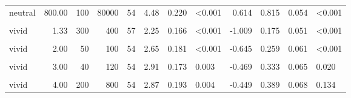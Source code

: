 \documentclass[
]{article}
\begin{document}
\begin{longtable}[t]{lrrrrrrlrrrl}
\hspace{1em}neutral & 800.00 & 100 & 80000 & 54 & 4.48 & 0.220 & <0.001 & 0.614 & 0.815 & 0.054 & <0.001\\
\hspace{1em}\cellcolor{gray!10}{vivid} & \cellcolor{gray!10}{1.33} & \cellcolor{gray!10}{30} & \cellcolor{gray!10}{40} & \cellcolor{gray!10}{54} & \cellcolor{gray!10}{2.24} & \cellcolor{gray!10}{0.171} & \cellcolor{gray!10}{<0.001} & \cellcolor{gray!10}{-1.013} & \cellcolor{gray!10}{0.148} & \cellcolor{gray!10}{0.049} & \cellcolor{gray!10}{<0.001}\\
\hspace{1em}vivid & 1.33 & 300 & 400 & 57 & 2.25 & 0.166 & <0.001 & -1.009 & 0.175 & 0.051 & <0.001\\
\hspace{1em}\cellcolor{gray!10}{vivid} & \cellcolor{gray!10}{2.00} & \cellcolor{gray!10}{20} & \cellcolor{gray!10}{40} & \cellcolor{gray!10}{57} & \cellcolor{gray!10}{2.39} & \cellcolor{gray!10}{0.147} & \cellcolor{gray!10}{<0.001} & \cellcolor{gray!10}{-1.015} & \cellcolor{gray!10}{0.158} & \cellcolor{gray!10}{0.049} & \cellcolor{gray!10}{<0.001}\\
\hspace{1em}vivid & 2.00 & 50 & 100 & 54 & 2.65 & 0.181 & <0.001 & -0.645 & 0.259 & 0.061 & <0.001\\
\hspace{1em}\cellcolor{gray!10}{vivid} & \cellcolor{gray!10}{3.00} & \cellcolor{gray!10}{10} & \cellcolor{gray!10}{30} & \cellcolor{gray!10}{57} & \cellcolor{gray!10}{2.83} & \cellcolor{gray!10}{0.179} & \cellcolor{gray!10}{<0.001} & \cellcolor{gray!10}{-0.505} & \cellcolor{gray!10}{0.281} & \cellcolor{gray!10}{0.061} & \cellcolor{gray!10}{0.001}\\
\hspace{1em}vivid & 3.00 & 40 & 120 & 54 & 2.91 & 0.173 & 0.003 & -0.469 & 0.333 & 0.065 & 0.020\\
\hspace{1em}\cellcolor{gray!10}{vivid} & \cellcolor{gray!10}{4.00} & \cellcolor{gray!10}{20} & \cellcolor{gray!10}{80} & \cellcolor{gray!10}{57} & \cellcolor{gray!10}{3.35} & \cellcolor{gray!10}{0.195} & \cellcolor{gray!10}{0.378} & \cellcolor{gray!10}{-0.102} & \cellcolor{gray!10}{0.456} & \cellcolor{gray!10}{0.067} & \cellcolor{gray!10}{0.597}\\
\hspace{1em}vivid & 4.00 & 200 & 800 & 54 & 2.87 & 0.193 & 0.004 & -0.449 & 0.389 & 0.068 & 0.134\\

\end{longtable}
\end{document}
